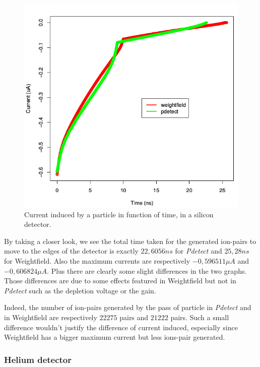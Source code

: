 \documentclass[11pt]{article}
\begin{document}
				\begin{figure}[H]
				  \center
				  \includegraphics[scale=0.5]{images/applications/silicon_current.png}
				  \caption{Current induced by a particle in function of time, in a silicon detector.}
				  \label{fig:silicon}
				\end{figure}

				By taking a closer look, we see the total time taken for the generated ion-pairs to move to the edges of the
				detector is exactly $22,6056ns$ for \textit{Pdetect} and $25,28ns$ for Weightfield. Also the maximum
				currents are respectively $-0,596511\mu A$ and $-0,606824\mu A$. Plus there are clearly some slight
				differences in the two graphs. Those differences are due to some effects featured in Weightfield
				but not in \textit{Pdetect} such as the depletion voltage or the gain.

				Indeed, the number of ion-pairs generated by the pass of particle in \textit{Pdetect} and in Weightfield
				are respectively $22275$ pairs and $21222$ pairs. Such a small difference wouldn't justify the difference
				of current induced, especially since Weightfield has a bigger maximum current but less ions-pair generated.

		\subsubsection{Helium detector}
\end{document}
